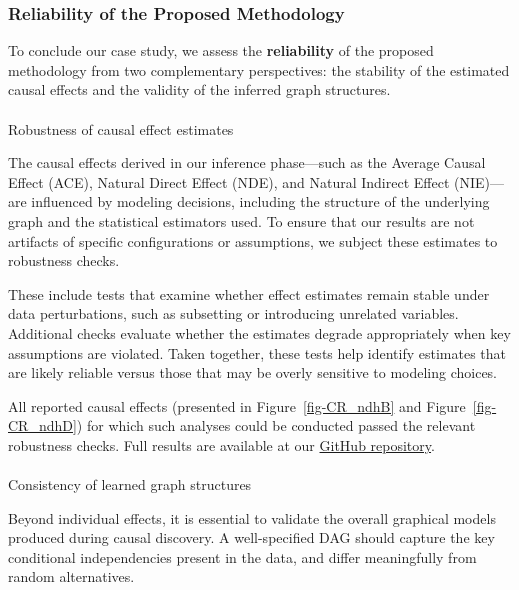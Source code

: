 \documentclass[
]{article}
\makeatletter
\let\oldparagraph\paragraph
\renewcommand{\paragraph}{
    \@ifstar
      \xxxParagraphStar
      \xxxParagraphNoStar
  }
\newcommand{\xxxParagraphStar}[1]{\oldparagraph*{#1}\mbox{}}
\newcommand{\xxxParagraphNoStar}[1]{\oldparagraph{#1}\mbox{}}
\theoremstyle{definition}
\theoremstyle{remark}
\makeatother
\begin{document}
\subsubsection{Reliability of the Proposed
Methodology}\label{sec-Reliability}

To conclude our case study, we assess the \textbf{reliability} of the
proposed methodology from two complementary perspectives: the stability
of the estimated causal effects and the validity of the inferred graph
structures.

\paragraph{Robustness of causal effect
estimates}\label{robustness-of-causal-effect-estimates}

The causal effects derived in our inference phase---such as the Average
Causal Effect (ACE), Natural Direct Effect (NDE), and Natural Indirect
Effect (NIE)---are influenced by modeling decisions, including the
structure of the underlying graph and the statistical estimators used.
To ensure that our results are not artifacts of specific configurations
or assumptions, we subject these estimates to robustness checks.

These include tests that examine whether effect estimates remain stable
under data perturbations, such as subsetting or introducing unrelated
variables. Additional checks evaluate whether the estimates degrade
appropriately when key assumptions are violated. Taken together, these
tests help identify estimates that are likely reliable versus those that
may be overly sensitive to modeling choices.

All reported causal effects (presented in Figure~\ref{fig-CR_ndhB} and
Figure~\ref{fig-CR_ndhD}) for which such analyses could be conducted
passed the relevant robustness checks. Full results are available at our
\href{https://github.com/cambroise/chloroDAG}{GitHub repository}.

\paragraph{Consistency of learned graph
structures}\label{sec-fals_tests}

Beyond individual effects, it is essential to validate the overall
graphical models produced during causal discovery. A well-specified DAG
should capture the key conditional independencies present in the data,
and differ meaningfully from random alternatives.
\end{document}
